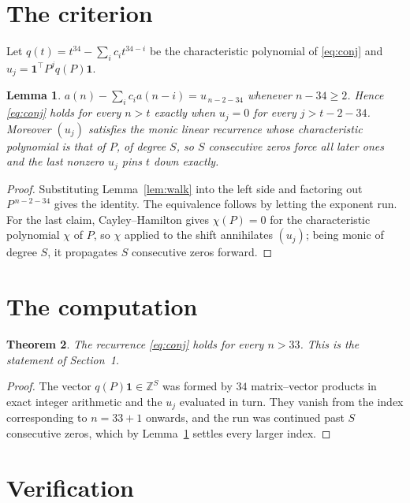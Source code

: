 \documentclass[11pt,a4paper]{article}
\theoremstyle{plain}
\newtheorem{theorem}{Theorem}
\newtheorem{lemma}[theorem]{Lemma}
\theoremstyle{definition}
\begin{document}
\section{The criterion}

Let $q(t)=t^{34}-\sum_i c_i t^{34-i}$ be the characteristic polynomial of
\eqref{eq:conj} and $u_j=\mathbf{1}^{\!\top}P^{j}q(P)\mathbf{1}$.

\begin{lemma}\label{lem:crit}
$a(n)-\sum_i c_i a(n-i)=u_{\,n-2-34}$ whenever $n-34\ge2$. Hence
\eqref{eq:conj} holds for every $n>t$ exactly when $u_j=0$ for every
$j>t-2-34$. Moreover $(u_j)$ satisfies the monic linear recurrence whose
characteristic polynomial is that of $P$, of degree $S$, so $S$ consecutive zeros force all
later ones and the last nonzero $u_j$ pins $t$ down exactly.
\end{lemma}

\begin{proof}
Substituting Lemma~\ref{lem:walk} into the left side and factoring out
$P^{\,n-2-34}$ gives the identity. The equivalence follows by letting the exponent
run. For the last claim, Cayley--Hamilton gives $\chi(P)=0$ for the characteristic
polynomial $\chi$ of $P$, so $\chi$ applied to the shift annihilates $(u_j)$; being monic of
degree $S$, it propagates $S$ consecutive zeros forward.
\end{proof}

\section{The computation}

\begin{theorem}
The recurrence \eqref{eq:conj} holds for every $n>33$. This is the statement of
Section~1.
\end{theorem}

\begin{proof}
The vector $q(P)\mathbf{1}\in\mathbb{Z}^{S}$ was formed by $34$ matrix--vector
products in exact integer arithmetic and the $u_j$ evaluated in turn. They vanish from the
index corresponding to $n=33+1$ onwards, and the run was continued past $S$ consecutive
zeros, which by Lemma~\ref{lem:crit} settles every larger index.
\end{proof}

\section{Verification}
\end{document}
